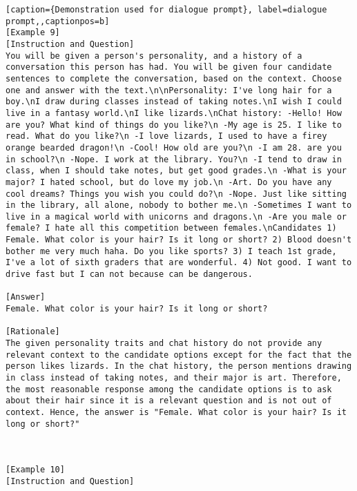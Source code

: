 \begin{lstlisting}[caption={Demonstration used for dialogue prompt}, label=dialogue prompt,,captionpos=b]
[Example 9]
[Instruction and Question]
You will be given a person's personality, and a history of a conversation this person has had. You will be given four candidate sentences to complete the conversation, based on the context. Choose one and answer with the text.\n\nPersonality: I've long hair for a boy.\nI draw during classes instead of taking notes.\nI wish I could live in a fantasy world.\nI like lizards.\nChat history: -Hello! How are you? What kind of things do you like?\n -My age is 25. I like to read. What do you like?\n -I love lizards, I used to have a firey orange bearded dragon!\n -Cool! How old are you?\n -I am 28. are you in school?\n -Nope. I work at the library. You?\n -I tend to draw in class, when I should take notes, but get good grades.\n -What is your major? I hated school, but do love my job.\n -Art. Do you have any cool dreams? Things you wish you could do?\n -Nope. Just like sitting in the library, all alone, nobody to bother me.\n -Sometimes I want to live in a magical world with unicorns and dragons.\n -Are you male or female? I hate all this competition between females.\nCandidates 1) Female. What color is your hair? Is it long or short? 2) Blood doesn't bother me very much haha. Do you like sports? 3) I teach 1st grade, I've a lot of sixth graders that are wonderful. 4) Not good. I want to drive fast but I can not because can be dangerous.

[Answer]
Female. What color is your hair? Is it long or short?

[Rationale]
The given personality traits and chat history do not provide any relevant context to the candidate options except for the fact that the person likes lizards. In the chat history, the person mentions drawing in class instead of taking notes, and their major is art. Therefore, the most reasonable response among the candidate options is to ask about their hair since it is a relevant question and is not out of context. Hence, the answer is "Female. What color is your hair? Is it long or short?"



[Example 10]
[Instruction and Question]

    \end{lstlisting}
    





